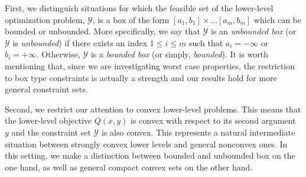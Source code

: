 \documentclass{article}
\newcommand*{\cY}{\mathcal{Y}}
\newcommand{\firstvar}{x}
\newcommand{\secondvar}{y}
\newcommand{\valoptim}{\varphi_o}
\newcommand{\valpessim}{\varphi_p}
\theoremstyle{plain}
\newtheorem{assumption}{Assumption}[section]
\theoremstyle{definition}
\begin{document}


First, we distinguish situations for which the feasible set of the lower-level optimization problem, $\cY$, is a box of the form $[a_1,b_1] \times \ldots [a_m, b_m]$ which can be bounded or unbounded. More specifically, we say that $\cY$ is an \emph{unbounded box} (or $\cY$ is \emph{unbounded}) if there exists an index $1 \leq i \leq m$ such that $a_i = -\infty$ or $b_i = +\infty$. Otherwise, $\cY$ is a \emph{bounded box} (or simply, \emph{bounded}). It is worth mentioning that, since we are investigating worst case properties, the restriction to box type constraints is actually a strength and our results hold for more general constraint sets. 

Second, we restrict our attention to convex lower-level problems. This means that the lower-level objective $Q(\firstvar, \secondvar)$ is convex with respect to its second argument $\secondvar$ and the constraint set $\cY$ is also convex. This represents a natural intermediate situation between strongly convex lower levels and general nonconvex ones. In this setting, we make a distinction between bounded and unbounded box on the one hand, as well as general compact convex sets on the other hand.

\end{document}
